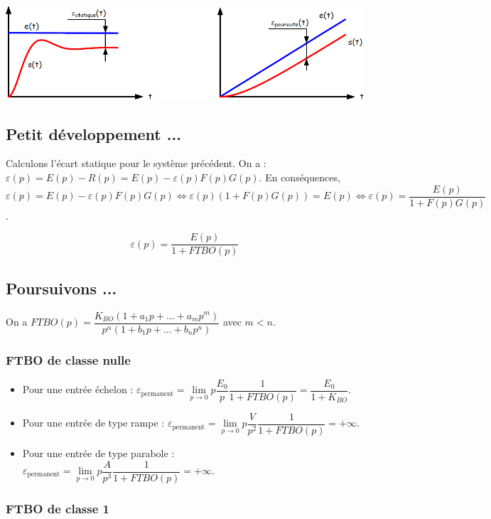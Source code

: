\documentclass[10pt,fleqn]{article} %
\begin{document}
\begin{center}
\includegraphics[width=.9\linewidth]{images/fig_erreur}
\end{center}

\subsection*{Petit développement ...}

Calculons l'écart statique pour le système précédent. On a : $\varepsilon(p)=E(p)-R(p)=E(p)-\varepsilon(p) F(p) G(p)$. En conséquences,
$\varepsilon(p)=E(p)-\varepsilon(p) F(p) G(p) 
\Longleftrightarrow \varepsilon(p)\left( 1+F(p) G(p) \right) =E(p) 
\Longleftrightarrow   \varepsilon(p) =\dfrac{E(p)}{1+F(p) G(p)}$.

\begin{resultat}
$$\varepsilon(p) =\dfrac{E(p)}{1+FTBO(p)}$$
\end{resultat}


\subsection*{Poursuivons ...}
On a $FTBO(p)=\dfrac{K_{BO}\left(1+a_1p+...+a_mp^m \right)}{p^{\alpha}\left(1+b_1p+...+b_np^n\right)}$ avec $m< n$.
\subsubsection*{FTBO de classe nulle}

\begin{itemize}
\item Pour une entrée échelon : 
$\varepsilon_{\text{permanent}}=\lim\limits_{p\to 0} p\dfrac{E_0}{p}\dfrac{1}{1+FTBO(p)} 
= \dfrac{E_0}{1+K_{BO}}$.
\item Pour une entrée de type rampe : 
$\varepsilon_{\text{permanent}}=\lim\limits_{p\to 0} p\dfrac{V}{p^2}\dfrac{1}{1+FTBO(p)} 
=+\infty$.
\item Pour une entrée de type parabole : 
$\varepsilon_{\text{permanent}}=\lim\limits_{p\to 0} p\dfrac{A}{p^3}\dfrac{1}{1+FTBO(p)} 
=+\infty$.
\end{itemize}

\subsubsection*{FTBO de classe 1}
\end{document}
